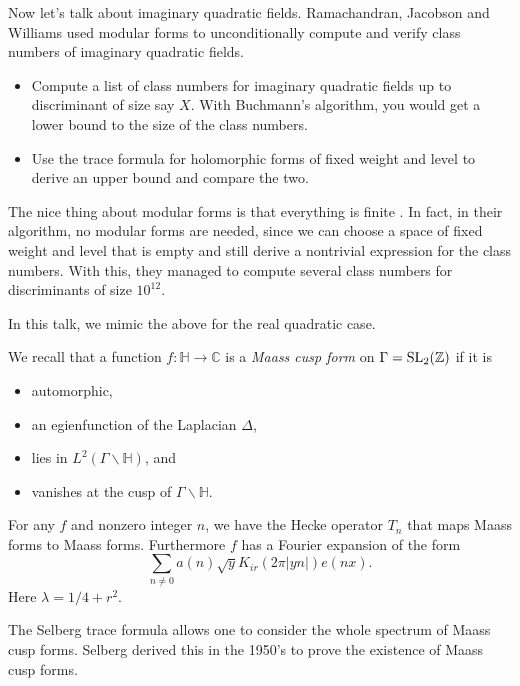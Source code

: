 \documentclass[reqno]{amsart} 
\begin{document}
Now let's talk about imaginary quadratic fields.  Ramachandran, Jacobson and Williams used modular forms to unconditionally compute and verify class numbers of imaginary quadratic fields.
\begin{itemize}
\item Compute a list of class numbers for imaginary quadratic fields up to discriminant of size say $X$.  With Buchmann's algorithm, you would get a lower bound to the size of the class numbers.
\item Use the trace formula for holomorphic forms of fixed weight and level to derive an upper bound and compare the two.
\end{itemize}
The nice thing about modular forms is that everything is finite . In fact, in their algorithm, no modular forms are needed, since we can choose a space of fixed weight and level that is empty and still derive a nontrivial expression for the class numbers.  With this, they managed to compute several class numbers for discriminants of size $10 ^{12}$.

In this talk, we mimic the above for the real quadratic case.

We recall that a function $f : \mathbb{H} \rightarrow \mathbb{C}$ is a \emph{Maass cusp form} on $\Gamma = \operatorname{SL}_2(\mathbb{Z})$ if it is
\begin{itemize}
\item automorphic,
\item an egienfunction of the Laplacian $\Delta$,
\item lies in $L^2(\Gamma \backslash \mathbb{H})$, and
\item vanishes at the cusp of $\Gamma \backslash \mathbb{H}$.
\end{itemize}
For any $f$ and nonzero integer $n$, we have the Hecke operator $T_n$ that maps Maass forms to Maass forms.  Furthermore $f$ has a Fourier expansion of the form
\begin{equation*}
  \sum_{n \neq 0} a(n) \sqrt{y} K_{i r}(2 \pi \lvert y n \rvert) e(n x).
\end{equation*}
Here $\lambda = 1/4 + r^2$.

The Selberg trace formula allows one to consider the whole spectrum of Maass cusp forms.  Selberg derived this in the 1950's to prove the existence of Maass cusp forms.
\end{document}
